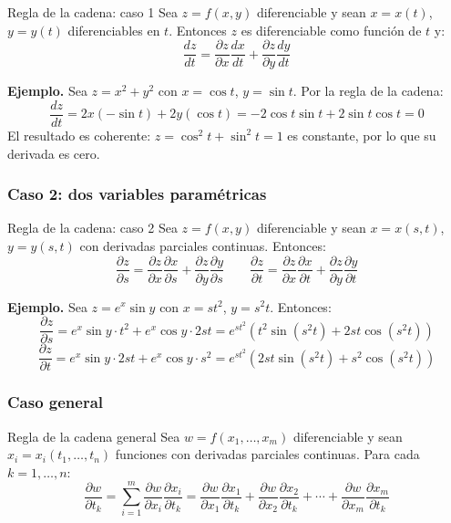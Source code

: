 \begin{mytheorem}{Regla de la cadena: caso 1}
Sea $z = f(x, y)$ diferenciable y sean $x = x(t)$, $y = y(t)$ diferenciables en $t$. Entonces $z$ es diferenciable como función de $t$ y:
\[
\frac{dz}{dt} = \frac{\partial z}{\partial x}\frac{dx}{dt} + \frac{\partial z}{\partial y}\frac{dy}{dt}
\]
\end{mytheorem}

\textbf{Ejemplo.} Sea $z = x^2 + y^2$ con $x = \cos t$, $y = \sin t$. Por la regla de la cadena:
\[
\frac{dz}{dt} = 2x(-\sin t) + 2y(\cos t) = -2\cos t\sin t + 2\sin t\cos t = 0
\]
El resultado es coherente: $z = \cos^2 t + \sin^2 t = 1$ es constante, por lo que su derivada es cero.

\subsubsection{Caso 2: dos variables paramétricas}

\begin{mytheorem}{Regla de la cadena: caso 2}
Sea $z = f(x, y)$ diferenciable y sean $x = x(s, t)$, $y = y(s, t)$ con derivadas parciales continuas. Entonces:
\[
\frac{\partial z}{\partial s} = \frac{\partial z}{\partial x}\frac{\partial x}{\partial s} + \frac{\partial z}{\partial y}\frac{\partial y}{\partial s}
\qquad
\frac{\partial z}{\partial t} = \frac{\partial z}{\partial x}\frac{\partial x}{\partial t} + \frac{\partial z}{\partial y}\frac{\partial y}{\partial t}
\]
\end{mytheorem}

\textbf{Ejemplo.} Sea $z = e^x \sin y$ con $x = st^2$, $y = s^2 t$. Entonces:
\[
\frac{\partial z}{\partial s}
= e^x \sin y \cdot t^2 + e^x \cos y \cdot 2st
= e^{st^2}(t^2 \sin(s^2 t) + 2st\cos(s^2 t))
\]
\[
\frac{\partial z}{\partial t}
= e^x \sin y \cdot 2st + e^x \cos y \cdot s^2
= e^{st^2}(2st\sin(s^2 t) + s^2\cos(s^2 t))
\]

\subsubsection{Caso general}

\begin{mytheorem}{Regla de la cadena general}
Sea $w = f(x_1, \dots, x_m)$ diferenciable y sean $x_i = x_i(t_1, \dots, t_n)$ funciones con derivadas parciales continuas. Para cada $k = 1, \dots, n$:
\[
\frac{\partial w}{\partial t_k}
= \sum_{i=1}^{m} \frac{\partial w}{\partial x_i}\frac{\partial x_i}{\partial t_k}
= \frac{\partial w}{\partial x_1}\frac{\partial x_1}{\partial t_k}
+ \frac{\partial w}{\partial x_2}\frac{\partial x_2}{\partial t_k}
+ \cdots
+ \frac{\partial w}{\partial x_m}\frac{\partial x_m}{\partial t_k}
\]
\end{mytheorem}

